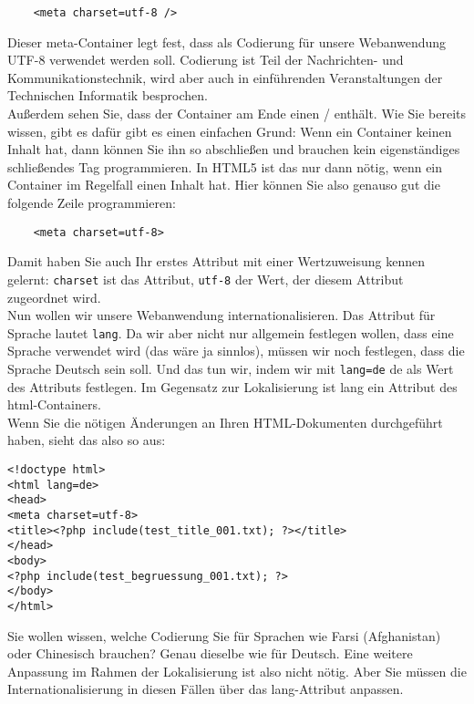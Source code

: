 \begin{verbatim}
	<meta charset=utf-8 />
\end{verbatim}


Dieser meta-Container legt fest, dass als Codierung für unsere Webanwendung UTF-8 verwendet werden soll. Codierung ist Teil der Nachrichten- und Kommunikationstechnik, wird aber auch in einführenden Veranstaltungen der Technischen Informatik besprochen.\\

Außerdem sehen Sie, dass der Container am Ende einen / enthält. Wie Sie bereits wissen, gibt es dafür gibt es einen einfachen Grund: Wenn ein Container keinen Inhalt hat, dann können Sie ihn so abschließen und brauchen kein eigenständiges schließendes Tag programmieren. In HTML5 ist das nur dann nötig, wenn ein Container im Regelfall einen Inhalt hat. Hier können Sie also genauso gut die folgende Zeile programmieren:

\begin{verbatim}
	<meta charset=utf-8>
\end{verbatim}

Damit haben Sie auch Ihr erstes Attribut mit einer Wertzuweisung kennen gelernt: \verb|charset| ist das Attribut, \verb|utf-8| der Wert, der diesem Attribut zugeordnet wird.\\

Nun wollen wir unsere Webanwendung internationalisieren. Das Attribut für Sprache lautet \verb|lang|. Da wir aber nicht nur allgemein festlegen wollen, dass eine Sprache verwendet wird (das wäre ja sinnlos), müssen wir noch festlegen, dass die Sprache Deutsch sein soll. Und das tun wir, indem wir mit \verb|lang=de| de als Wert des Attributs festlegen. Im Gegensatz zur Lokalisierung ist lang ein Attribut des html-Containers.\\

Wenn Sie die nötigen Änderungen an Ihren HTML-Dokumenten durchgeführt haben, sieht das also so aus:

\begin{verbatim}
<!doctype html>
<html lang=de>
<head>
<meta charset=utf-8>
<title><?php include(test_title_001.txt); ?></title>
</head>
<body>
<?php include(test_begruessung_001.txt); ?>
</body>
</html>
\end{verbatim}

Sie wollen wissen, welche Codierung Sie für Sprachen wie Farsi (Afghanistan) oder Chinesisch brauchen? Genau dieselbe wie für Deutsch. Eine weitere Anpassung im Rahmen der Lokalisierung ist also nicht nötig. Aber Sie müssen die Internationalisierung in diesen Fällen über das lang-Attribut anpassen.\\

